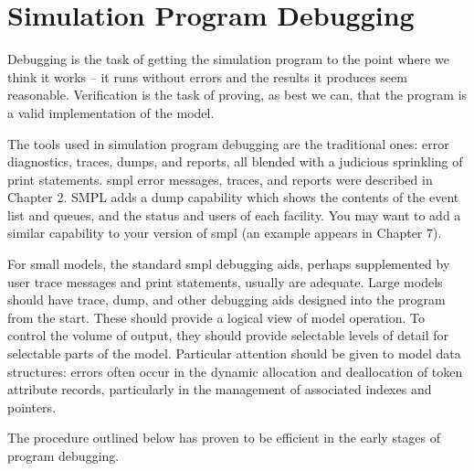\section{Simulation Program Debugging}
\label{sec:simulation-program-debugging}

Debugging is the task of getting the simulation program to the point where we
think it works -- it runs without errors and the results it produces seem
reasonable. Verification is the task of proving, as best we can, that the
program is a valid implementation of the model.

The tools used in simulation program debugging are the traditional ones: error
diagnostics, traces, dumps, and reports, all blended with a judicious
sprinkling of print statements. smpl error messages, traces, and reports were
 described in Chapter 2. SMPL adds a dump capability which shows the contents
of the event list and queues, and the status and users of each facility.
You may want to add a similar capability to your version of smpl (an example
appears in Chapter 7).

For small models, the standard smpl debugging aids, perhaps supplemented by
user trace messages and print statements, usually are adequate. Large models
should have trace, dump, and other debugging aids designed into the program
from the start. These should provide a logical view of model operation. To
control the volume of output, they should provide selectable levels of detail
for selectable parts of the model. Particular attention should be given to
model data structures: errors often occur in the dynamic allocation and
deallocation of token attribute records, particularly in the management of
associated indexes and pointers.

The procedure outlined below has proven to be efficient in the early stages of
program debugging.

